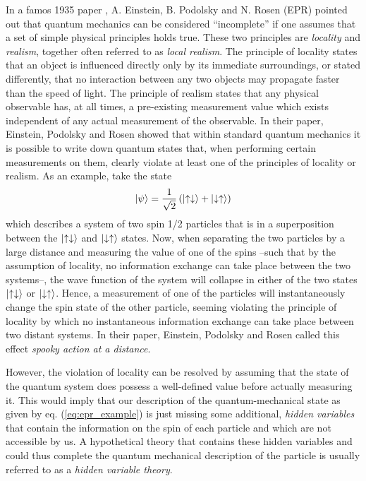 In a famos 1935 paper \citep{einstein_can_1935}, A. Einstein, B. Podolsky and N. Rosen (EPR) pointed out that quantum mechanics can be considered ``incomplete'' if one assumes that a set of simple physical principles holds true. These two principles are {\it locality} and {\it realism}, together often referred to as {\it local realism}. The principle of locality states that an object is influenced directly only by its immediate surroundings, or stated differently, that no interaction between any two objects may propagate faster than the speed of light. The principle of realism states that any physical observable has, at all times, a pre-existing measurement value which exists independent of any actual measurement of the observable. In their paper, Einstein, Podolsky and Rosen showed that within standard quantum mechanics it is possible to write down quantum states that, when performing certain measurements on them, clearly violate at least one of the principles of locality or realism. As an example, take the state
%
\begin{equation}
\left| \psi \right> = \frac{1}{\sqrt{2}}\left(\left| \uparrow \downarrow \right>+\left| \downarrow \uparrow \right>\right) \label{eq:epr_example}
\end{equation}
%
which describes a system of two spin 1/2 particles that is in a superposition between the $\left| \uparrow \downarrow \right>$ and $\left| \downarrow \uparrow \right>$ states. Now, when separating the two particles by a large distance and measuring the value of one of the spins --such that by the assumption of locality, no information exchange can take place between the two systems--, the wave function of the system will collapse in either of the two states $\left| \uparrow \downarrow \right>$ or $\left| \downarrow \uparrow \right>$. Hence, a measurement of one of the particles will instantaneously change the spin state of the other particle, seeming violating the principle of locality by which no instantaneous information exchange can take place between two distant systems. In their paper, Einstein, Podolsky and Rosen called this effect {\it spooky action at a distance}.

\smallskip

However, the violation of locality can be resolved by assuming that the state of the quantum system does  possess a well-defined value before actually measuring it. This would imply that our description of the quantum-mechanical state as given by eq. (\ref{eq:epr_example}) is just missing some additional, {\it hidden variables} that contain the information on the spin of each particle and which are not accessible by us. A hypothetical theory that contains these hidden variables and could thus complete the quantum mechanical description of the particle is usually referred to as a {\it hidden variable theory}.

